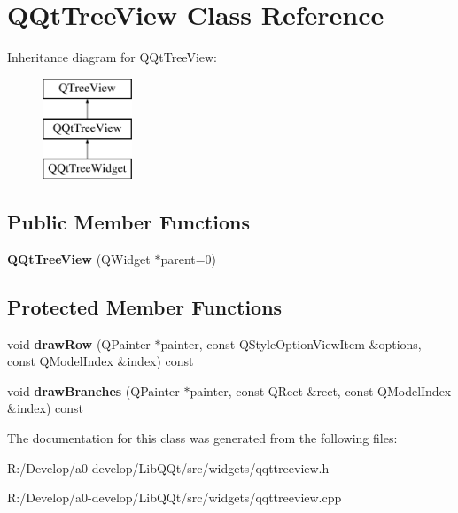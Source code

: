 \hypertarget{class_q_qt_tree_view}{}\section{Q\+Qt\+Tree\+View Class Reference}
\label{class_q_qt_tree_view}
Inheritance diagram for Q\+Qt\+Tree\+View\+:\begin{figure}[H]
\begin{center}
\leavevmode
\includegraphics[height=3.000000cm]{class_q_qt_tree_view}
\end{center}
\end{figure}
\subsection*{Public Member Functions}
\begin{DoxyCompactItemize}
\item 
\mbox{\label{class_q_qt_tree_view_a32b369b404ef317c8a8f5d64a0ee096d}} 
{\bfseries Q\+Qt\+Tree\+View} (Q\+Widget $\ast$parent=0)
\end{DoxyCompactItemize}
\subsection*{Protected Member Functions}
\begin{DoxyCompactItemize}
\item 
\mbox{\label{class_q_qt_tree_view_a59240d6e71dbf0fe787bb8c5358b0f43}} 
void {\bfseries draw\+Row} (Q\+Painter $\ast$painter, const Q\+Style\+Option\+View\+Item \&options, const Q\+Model\+Index \&index) const
\item 
\mbox{\label{class_q_qt_tree_view_a1765dae1a17a754f10f507c43881f5cd}} 
void {\bfseries draw\+Branches} (Q\+Painter $\ast$painter, const Q\+Rect \&rect, const Q\+Model\+Index \&index) const
\end{DoxyCompactItemize}


The documentation for this class was generated from the following files\+:\begin{DoxyCompactItemize}
\item 
R\+:/\+Develop/a0-\/develop/\+Lib\+Q\+Qt/src/widgets/qqttreeview.\+h\item 
R\+:/\+Develop/a0-\/develop/\+Lib\+Q\+Qt/src/widgets/qqttreeview.\+cpp\end{DoxyCompactItemize}
